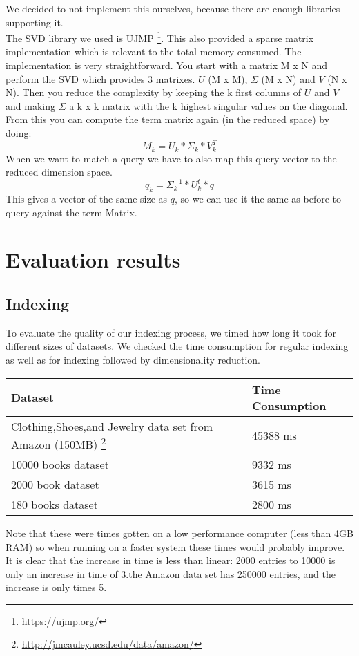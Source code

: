 \documentclass[10pt,a4paper]{paper}
\begin{document}
We decided to not implement this ourselves, because there are enough libraries supporting it.\\
The SVD library we used is UJMP \footnote{\url{https://ujmp.org/}}. This also provided a sparse matrix implementation which is relevant to the total memory consumed. The implementation is very straightforward. You start with a matrix M x N and perform the SVD which provides 3 matrixes. $U$ (M x M), $\Sigma$ (M x N) and $V$ (N x N). Then you reduce the complexity by keeping the k first columns of $U$ and $V$ and making $\Sigma$ a k x k matrix with the k highest singular values on the diagonal. From this you can compute the term matrix again (in the reduced space) by doing:
\[
M_k = U_k * \Sigma_k * V_k^T
\]
When we want to match a query we have to also map this query vector to the reduced dimension space.
\[
q_k = \Sigma_k^{-1} * U_k^t * q
\]
This gives a vector of the same size as $q$, so we can use it the same as before to query against the term Matrix.

\section{Evaluation results}

\subsection{Indexing}

To evaluate the quality of our indexing process, we timed how long it took for different sizes of datasets. We checked the time consumption for regular indexing as well as for indexing followed by dimensionality reduction. 

\begin{tabular} {l|l}
Dataset & Time Consumption \\ \hline
Clothing,Shoes,and Jewelry data set from Amazon (150MB) \footnote{\url{http://jmcauley.ucsd.edu/data/amazon/}} &  45388 ms \\ \hline
10000 books dataset & 9332 ms \\ \hline
2000 book dataset & 3615 ms \\ \hline
180 books dataset & 2800 ms \\ \hline

\end{tabular}
Note that these were times gotten on a low performance computer (less than 4GB RAM) so when running on a faster system these times would probably improve.
It is clear that the increase in time is less than linear: 2000 entries to 10000 is only an increase in time of 3.the Amazon data set has 250000 entries, and the increase is only times 5.
\end{document}
